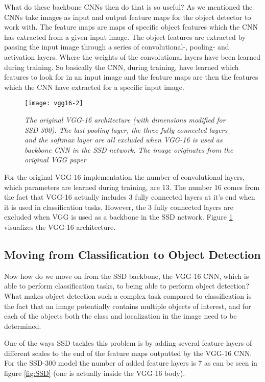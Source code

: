 \documentclass{article}
\begin{document}
What do these backbone CNNs then do that is so useful? As we mentioned the CNNs take images as input and output feature maps for the object detector to work with. The feature maps are maps of specific object features which the CNN has extracted from a given input image. The object features are extracted by passing the input image through a series of convolutional-, pooling- and activation layers. Where the weights of the convolutional layers have been learned during training. So basically the CNN, during training, have learned which features to look for in an input image and the feature maps are then the features which the CNN have extracted for a specific input image.   

\begin{figure}[h]
\centering
\texttt{[image: vgg16-2]}
\caption{\textit{The original VGG-16 architecture (with dimensions modified for SSD-300). The last pooling layer, the three fully connected layers and the softmax layer are all excluded when VGG-16 is used as backbone CNN in the SSD network. The image originates from the original VGG paper \citep{VGG}}}
\label{fig:vgg16}     
\end{figure}    

For the original VGG-16 implementation the number of convolutional layers, which parameters are learned during training, are 13. The number 16 comes from the fact that VGG-16 actually includes 3 fully connected layers at it's end when it is used in classification tasks. However, the 3 fully connected layers are excluded when VGG is used as a backbone in the SSD network. Figure \ref{fig:vgg16} visualizes the VGG-16 architecture.

\subsection{Moving from Classification to Object Detection}
Now how do we move on from the SSD backbone, the VGG-16 CNN, which is able to perform classification tasks, to being able to perform object detection? What makes object detection such a complex task compared to classification is the fact that an image potentially contains multiple objects of interest, and for each of the objects both the class and localization in the image need to be determined.   
   
One of the ways SSD tackles this problem is by adding several feature layers of different scales to the end of the feature maps outputted by the VGG-16 CNN. For the SSD-300 model the number of added feature layers is 7 as can be seen in figure \ref{fig:SSD} (one is actually inside the VGG-16 body).   
\end{document}
